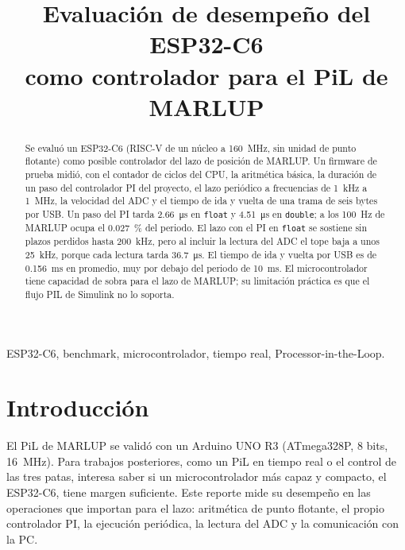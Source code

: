 \documentclass[conference]{IEEEtran}
\begin{document}
\title{Evaluación de desempeño del ESP32-C6\\como controlador para el PiL de MARLUP}

\author{
}

\maketitle

\begin{abstract}
Se evaluó un ESP32-C6 (RISC-V de un núcleo a \SI{160}{MHz}, sin unidad de punto flotante) como posible controlador del lazo de posición de MARLUP. Un firmware de prueba midió, con el contador de ciclos del CPU, la aritmética básica, la duración de un paso del controlador PI del proyecto, el lazo periódico a frecuencias de \SI{1}{kHz} a \SI{1}{MHz}, la velocidad del ADC y el tiempo de ida y vuelta de una trama de seis bytes por USB. Un paso del PI tarda \SI{2.66}{\micro s} en \texttt{float} y \SI{4.51}{\micro s} en \texttt{double}; a los \SI{100}{Hz} de MARLUP ocupa el \SI{0.027}{\percent} del periodo. El lazo con el PI en \texttt{float} se sostiene sin plazos perdidos hasta \SI{200}{kHz}, pero al incluir la lectura del ADC el tope baja a unos \SI{25}{kHz}, porque cada lectura tarda \SI{36.7}{\micro s}. El tiempo de ida y vuelta por USB es de \SI{0.156}{ms} en promedio, muy por debajo del periodo de \SI{10}{ms}. El microcontrolador tiene capacidad de sobra para el lazo de MARLUP; su limitación práctica es que el flujo PIL de Simulink no lo soporta.
\end{abstract}

\begin{IEEEkeywords}
ESP32-C6, benchmark, microcontrolador, tiempo real, Processor-in-the-Loop.
\end{IEEEkeywords}

\section{Introducción}
El PiL de MARLUP se validó con un Arduino UNO R3 (ATmega328P, 8 bits, \SI{16}{MHz}). Para trabajos posteriores, como un PiL en tiempo real o el control de las tres patas, interesa saber si un microcontrolador más capaz y compacto, el ESP32-C6, tiene margen suficiente. Este reporte mide su desempeño en las operaciones que importan para el lazo: aritmética de punto flotante, el propio controlador PI, la ejecución periódica, la lectura del ADC y la comunicación con la PC.
\end{document}
